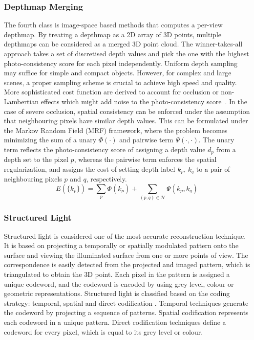 \subsubsection{Depthmap Merging}
The fourth class is image-space based methods that computes a per-view depthmap. By treating a depthmap as a 2D array of 3D points, multiple depthmaps can be considered as a merged 3D point cloud. The winner-takes-all approach takes a set of discretised depth values and pick the one with the highest photo-consistency score for each pixel independently. Uniform depth sampling may suffice for simple and compact objects. However, for complex and large scenes, a proper sampling scheme is crucial to achieve high speed and quality. More sophisticated cost function are derived to account for occlusion or non-Lambertian effects which might add noise to the photo-consistency score~\cite{goesele2006multi,vogiatzis2007multiview}. In the case of severe occlusion, spatial consistency can be enforced under the assumption that neighbouring pixels have similar depth values. This can be formulated under the Markov Random Field (MRF) framework, where the problem becomes minimizing the sum of a unary $\Phi(\cdot)$ and pairwise term $\Psi(\cdot, \cdot)$. The unary term reflects the photo-consistency score of assigning a depth value $d_p$ from a depth set to the pixel $p$, whereas the pairwise term enforces the spatial regularization, and assigns the cost of setting depth label $k_p$, $k_q$ to a pair of neighbouring pixels $p$ and $q$, respectively.
$$
E(\{k_p\})= \sum_p \Phi(k_p) + \sum_{(p,q)\in\mathcal{N}}\Psi(k_p, k_q)
$$

\subsubsection{Structured Light}
Structured light is considered one of the most accurate reconstruction technique. It is based on projecting a temporally or spatially modulated pattern onto the surface and viewing the illuminated surface from one or more points of view. The correspondence is easily detected from the projected and imaged pattern, which is triangulated to obtain the 3D point. Each pixel in the pattern is assigned a unique codeword, and the codeword is encoded by using grey level, colour or geometric representations. Structured light is classified based on the coding strategy: temporal, spatial and direct codification \cite{salvi2004pattern}. Temporal techniques generate the codeword by projecting a sequence of patterns. Spatial codification represents each codeword in a unique pattern. Direct codification techniques define a codeword for every pixel, which is equal to its grey level or colour.

